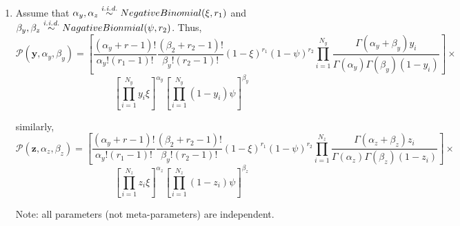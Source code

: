 \documentclass[twoside,11pt]{amsart}
\begin{document}
\begin{enumerate}
\begin{enumerate}
  \item    
    Assume that $\alpha_y, \alpha_z \overset{\text{\em i.i.d.}}{\sim}
    Negative Binomial(\xi, r_1)$ and $\beta_y, \beta_z \overset{\text{\em i.i.d.}}{\sim}
    Nagative Bionmial(\psi, r_2)$.
    Thus, 
    \[
    \mathscr P(\bm y, \alpha_y, \beta_y) = \left[\frac{(\alpha_y+r-1)!}{\alpha_y!(r_1-1)!}\frac{(\beta_2+r_2-1)!}{\beta_y!(r_2-1)!}(1-\xi)^{r_1}(1-\psi)^{r_2}\prod_{i=1}^{N_y}\frac{\Gamma(\alpha_y+\beta_y)y_i}{\Gamma(\alpha_y)\Gamma(\beta_y)(1-y_i)}\right]
    \times\]
    \[
\left[\prod_{i=1}^{N_y}y_i\xi\right]^{\alpha_y}\left[\prod_{i=1}^{N_y}(1-y_i)\psi\right]^{\beta_y}
    \]
    
    similarly,
    \[
    \mathscr P(\bm z, \alpha_z, \beta_z) =
    \left[\frac{(\alpha_y+r-1)!}{\alpha_y!(r_1-1)!}\frac{(\beta_2+r_2-1)!}{\beta_y!(r_2-1)!}(1-\xi)^{r_1}(1-\psi)^{r_2}\prod_{i=1}^{N_z}\frac{\Gamma(\alpha_z+\beta_z)z_i}{\Gamma(\alpha_z)\Gamma(\beta_z)(1-z_i)}\right]
    \times\]
    \[
    \left[\prod_{i=1}^{N_z}z_i\xi\right]^{\alpha_z}\left[\prod_{i=1}^{N_z}(1-z_i)\psi\right]^{\beta_z}
    \]

    Note: all parameters (not meta-parameters) are independent.


\end{enumerate}
\end{enumerate}
\end{document}
